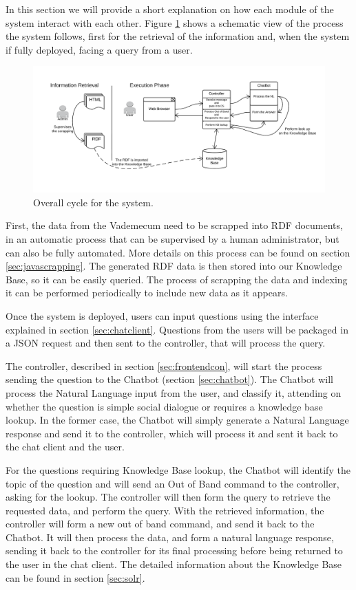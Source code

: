 In this section we will provide a short explanation on how each module of the system interact with each other. Figure \ref{fig:lifecycle} shows a schematic view of the process the system follows, first for the retrieval of the information and, when the system if fully deployed, facing a query from a user.

\begin{figure}[!htbp]
    \centering
    \includegraphics[width=\textwidth]{img/prot/lifecycle.png}
    \caption{Overall cycle for the system.}
    \label{fig:lifecycle}
\end{figure}

First, the data from the Vademecum need to be scrapped into \ac{RDF} documents, in an automatic process that can be supervised by a human administrator, but can also be fully automated. More details on this process can be found on section \ref{sec:javascrapping}. The generated \ac{RDF} data is then stored into our Knowledge Base, so it can be easily queried. The process of scrapping the data and indexing it can be performed periodically to include new data as it appears.

Once the system is deployed, users can input questions using the interface explained in section \ref{sec:chatclient}. Questions from the users will be packaged in a JSON request and then sent to the controller, that will process the query.

The controller, described in section \ref{sec:frontendcon}, will start the process sending the question to the Chatbot (section \ref{sec:chatbot}). The Chatbot will process the Natural Language input from the user, and classify it, attending on whether the question is simple social dialogue or requires a knowledge base lookup. In the former case, the Chatbot will simply generate a Natural Language response and send it to the controller, which will process it and sent it back to the chat client and the user. 

For the questions requiring Knowledge Base lookup, the Chatbot will identify the topic of the question and will send an Out of Band command to the controller, asking for the lookup. The controller will then form the query to retrieve the requested data, and perform the query. With the retrieved information, the controller will form a new out of band command, and send it back to the Chatbot. It will then process the data, and form a natural language response, sending it back to the controller for its final processing before being returned to the user in the chat client. The detailed information about the Knowledge Base can be found in section \ref{sec:solr}.

